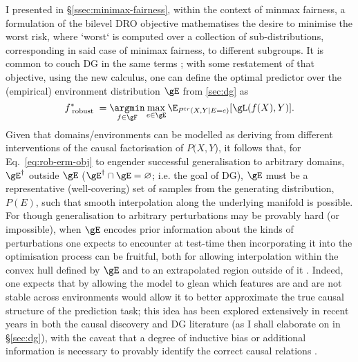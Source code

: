 I presented in \S\ref{ssec:minimax-fairness}, within the context of minmax fairness, a formulation
of the bilevel \ac{DRO} objective mathematises the desire to minimise the worst risk, where `worst`
is computed over a collection of sub-distributions, corresponding in said case of minimax fairness,
to different subgroups.
%
It is common to couch \ac{DG} in the same terms \citep{arjovsky2019invariant, krueger2021out,
sagawa2019distributionally}; with some restatement of that objective, using the new calculus, one
can define the optimal predictor over the (empirical) environment distribution \(\gE\) from
\ref{sec:dg} as
%
\begin{equation}\label{eq:rob-erm-obj} 
    f^\ast_\text{ robust } =
    \underset{ f \in \gF }{ \argmin }\, 
    \underset{ e \in \gE}{ \mathrm{max} }\,
    \E_{ P^{tr}( X, Y | E = e ) } [ \gL ( f( X ), Y ) ]. 
\end{equation}
%
Given that domains/environments can be modelled as deriving from different interventions of the
causal factorisation of \(P(X, Y\)), it follows that, for Eq.~\ref{eq:rob-erm-obj} to engender
successful generalisation to arbitrary domains, \(\gE^\dagger\) outside \(\gE\) (\( \gE^\dagger
\cap \gE = \varnothing \); i.e. the goal of \ac{DG}), \(\gE\) must be a representative
(well-covering) set of samples from the generating distribution, \( P(E) \), such that smooth
interpolation along the underlying manifold is possible.
%
%
For though generalisation to arbitrary perturbations may be provably hard (or impossible), when
\(\gE\) encodes prior information about the kinds of perturbations one expects to encounter at
test-time then incorporating it into the optimisation process can be fruitful, both for allowing
interpolation within the convex hull defined by \(\gE\) and to an extrapolated region outside of it
\citep{krueger2021out}.
%
Indeed, one expects that by allowing the model to glean which features are and are not stable
across environments would allow it to better approximate the true causal structure of the
prediction task;
%
this idea has been explored extensively in recent years in both the causal discovery
\citep{peters2016causal, bengio2019meta} and \ac{DG} \citep{arjovsky2019invariant,
ahuja2020invariant, creager2021environment} literature (as I shall elaborate on in \S\ref{sec:dg}),
with the caveat that a degree of inductive bias or additional information is necessary to provably
identify the correct causal relations \citep{lin2022zin}.
%

